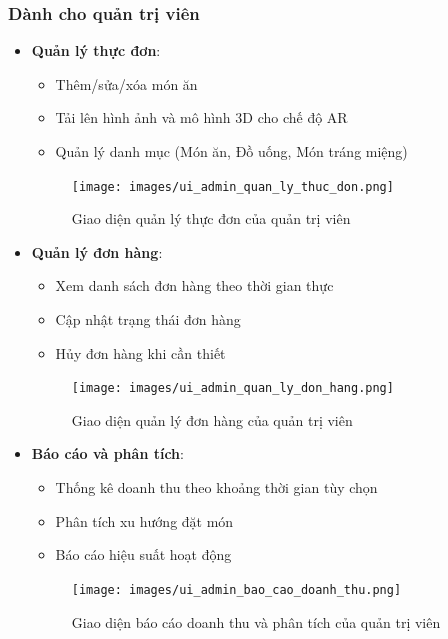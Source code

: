 \documentclass[12pt,a4paper]{article}
\begin{document}
\subsubsection{Dành cho quản trị viên}
\begin{itemize}[leftmargin=1cm]
    \item \textbf{Quản lý thực đơn}:
        \begin{itemize}[leftmargin=0.5cm]
            \item Thêm/sửa/xóa món ăn
            \item Tải lên hình ảnh và mô hình 3D cho chế độ AR
            \item Quản lý danh mục (Món ăn, Đồ uống, Món tráng miệng)
        \end{itemize}
\begin{figure}[H]
    \centering
    \texttt{[image: images/ui\_admin\_quan\_ly\_thuc\_don.png]} %
    \caption{Giao diện quản lý thực đơn của quản trị viên}
    \label{fig:ui_admin_menu}
\end{figure}

    \item \textbf{Quản lý đơn hàng}:
        \begin{itemize}[leftmargin=0.5cm]
            \item Xem danh sách đơn hàng theo thời gian thực
            \item Cập nhật trạng thái đơn hàng
            \item Hủy đơn hàng khi cần thiết
        \end{itemize}
\begin{figure}[H]
    \centering
    \texttt{[image: images/ui\_admin\_quan\_ly\_don\_hang.png]} %
    \caption{Giao diện quản lý đơn hàng của quản trị viên}
    \label{fig:ui_admin_orders}
\end{figure}

    \item \textbf{Báo cáo và phân tích}:
        \begin{itemize}[leftmargin=0.5cm]
            \item Thống kê doanh thu theo khoảng thời gian tùy chọn
            \item Phân tích xu hướng đặt món
            \item Báo cáo hiệu suất hoạt động
        \end{itemize}
\begin{figure}[H]
    \centering
    \texttt{[image: images/ui\_admin\_bao\_cao\_doanh\_thu.png]} %
    \caption{Giao diện báo cáo doanh thu và phân tích của quản trị viên}
    \label{fig:ui_admin_revenue}
\end{figure}


\end{itemize}
\end{document}
